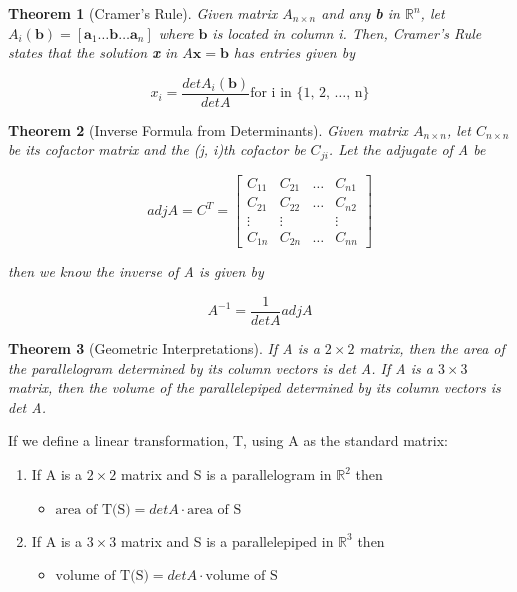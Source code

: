 \documentclass[12pt]{report}
\newtheorem{thm}{Theorem}
\newcommand{\mtx}[3]{$#1_{#2\times #3}$}
\newcommand{\mateq}{$A\bm{x}=\bm{b}$}
\begin{document}
\begin{thm}[Cramer's Rule]
Given matrix \mtx{A}{n}{n} and any \textbf{b} in $\mathbb{R}^n$, let $A_i(\bm{b})=[\bm{a}_1 \ldots \bm{b} \ldots \bm{a}_n]$ where $\bm{b}$ is located in column i. Then, Cramer's Rule states that the solution \textbf{x} in \mateq{} has entries given by

\begin{equation}
x_i = \frac{det A_i(\bm{b})}{det A} \text{for i in \{1, 2, \ldots, n\}}
\end{equation}

\end{thm}

\begin{thm}[Inverse Formula from Determinants]
Given matrix \mtx{A}{n}{n}, let \mtx{C}{n}{n} be its cofactor matrix and the (j, i)th cofactor be $C_{ji}$. Let the adjugate of A be 

\begin{equation}
adj A = C^T = 
\begin{bmatrix}
C_{11} & C_{21} & \ldots & C_{n1} \\
C_{21} & C_{22} & \ldots & C_{n2} \\
\vdots & \vdots & & \vdots \\
C_{1n} & C_{2n} & \ldots & C_{nn}
\end{bmatrix}
\end{equation} 

then we know the inverse of A is given by

\begin{equation}
A^{-1} = \frac{1}{det A} adj A
\end{equation}

\end{thm}

\begin{thm}[Geometric Interpretations]
If A is a $2 \times 2$ matrix, then the area of the parallelogram determined by its column vectors is det A. If A is a $3 \times 3$ matrix, then the volume of the parallelepiped determined by its column vectors is det A.
\end{thm}

If we define a linear transformation, T, using A as the standard matrix:
\begin{enumerate}
\item If A is a $2 \times 2$ matrix and S is a parallelogram in $\mathbb{R}^2$ then
\begin{itemize}
\item ${\text{area of T(S)}} = det A \cdot {\text{area of S}}$
\end{itemize}

\item If A is a $3 \times 3$ matrix and S is a parallelepiped in $\mathbb{R}^3$ then
\begin{itemize}
\item ${\text{volume of T(S)}} = det A \cdot {\text{volume of S}}$
\end{itemize}
\end{enumerate}
\end{document}
